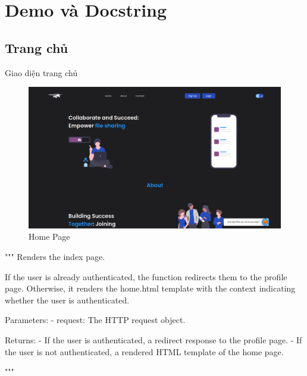 \documentclass[paper=a4wide, fontsize=12pt]{scrartcl}	 %
\begin{document}
\section{Demo và Docstring}


\subsection{Trang chủ}
Giao diện trang chủ
\begin{figure}[H]
    \centering 
    \includegraphics[scale=0.3]{demo/home.png}
    \caption{Home Page}
\end{figure}

"""
    Renders the index page.

    If the user is already authenticated, the function redirects them to the profile page.
    Otherwise, it renders the home.html template with the context indicating whether the user is authenticated.

    Parameters:
    - request: The HTTP request object.

    Returns:
    - If the user is authenticated, a redirect response to the profile page.
    - If the user is not authenticated, a rendered HTML template of the home page.

"""
\end{document}
